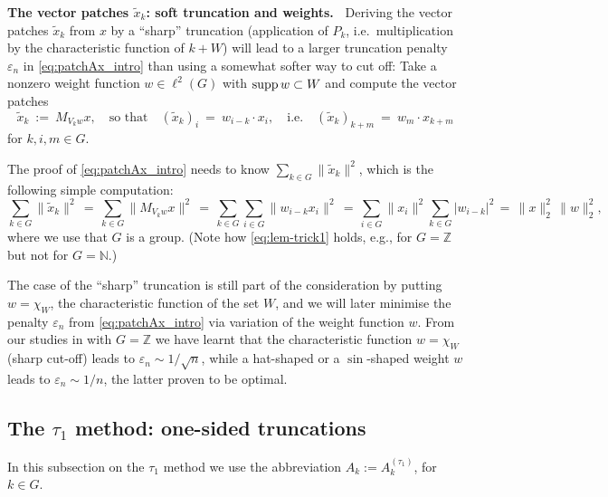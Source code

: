 \documentclass{article}
\newcommand\N{{\mathbb N}}
\newcommand\Z{{\mathbb Z}}
\newcommand\eps{{\varepsilon}}
\newcommand\supp{{\rm supp\,}}
\numberwithin{equation}{section}   %
\numberwithin{figure}{section}  %
\begin{document}

\medskip\noindent
{\bf The vector patches $\tilde x_k$: soft truncation and weights.\ }
Deriving the vector patches $\tilde x_k$ from $x$ by a ``sharp'' truncation (application of $P_k$, i.e.~multiplication by the characteristic function of $k+W$) will lead to a larger truncation penalty $\eps_n$ in \eqref{eq:patchAx_intro} than using a somewhat softer way to cut off: Take a nonzero weight function $w\in \ell^2(G)$ with $\supp w \subset W$ and compute the vector patches
\begin{equation} \label{eq:patchx}
\tilde x_k\ :=\ M_{V_kw}x,\quad\text{so that}\quad (\tilde x_k)_i\ =\ w_{i-k}\cdot x_i,\quad\text{i.e.}\quad (\tilde x_k)_{k+m}\ =\ w_m\cdot x_{k+m}
\end{equation}
for $k,i,m\in G$. 

The proof of \eqref{eq:patchAx_intro} needs to know $\sum_{k\in G} \|\tilde x_k\|^2$, which is the following simple computation:
\begin{equation}\label{eq:lem-trick1}
\sum_{k\in G} \|\tilde x_k\|^2\, =\, \sum_{k\in G}\|M_{V_kw}x\|^2\, =\, \sum_{k\in G}\sum_{i\in G}\|w_{i-k}x_i\|^2\, =\, \sum_{i\in G}\|x_i\|^2\sum_{k\in G}|w_{i-k}|^2\, =\, \|x\|_2^2\,\|w\|_2^2,
\end{equation}
where we use that $G$ is a group. (Note how \eqref{eq:lem-trick1} holds, e.g., for $G=\Z$ but not for $G=\N$.)

The case of the ``sharp'' truncation is still part of the consideration by putting $w=\chi_W$, the characteristic function of the set $W$, and we will later minimise the penalty $\eps_n$ from \eqref{eq:patchAx_intro} via variation of the weight function $w$. From our studies in \cite{CW.Heng.ML:JST} with $G=\Z$ we have learnt that the characteristic function $w=\chi_W$ (sharp cut-off) leads to $\eps_n\sim 1/\sqrt n$, while a hat-shaped or a $\sin$-shaped weight $w$ leads to $\eps_n\sim 1/n$, the latter proven to be optimal.






\subsection{The \texorpdfstring{$\tau_1$}{tau1} method: one-sided truncations}

In this subsection on the $\tau_1$ method we use the abbreviation $A_k := A_k^{(\tau_1)}$, for $k\in G$. %
\end{document}
